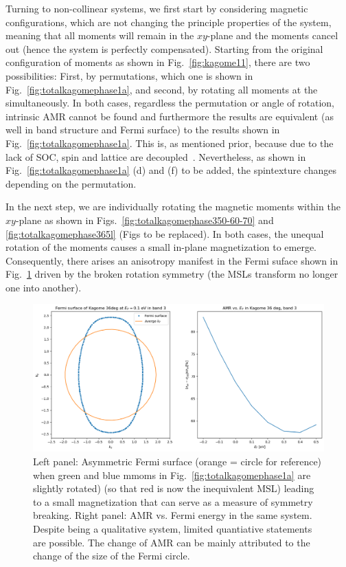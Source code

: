 \documentclass[prb,showpacs,amsmath,amssymb,superscriptaddress,twocolumn,floatfix]{revtex4-1}
\begin{document}
Turning to non-collinear systems, we
first start by considering magnetic configurations, which are not changing the principle properties of the system, meaning that all moments will remain in the $xy$-plane and the moments cancel out (hence the system is perfectly compensated). Starting from the original configuration of moments as shown in Fig.~\ref{fig:kagome11}, there are two possibilities: First, by permutations, which one is shown in Fig.~\ref{fig:totalkagomephase1a}, and second, by rotating all moments at the simultaneously. In both cases, regardless the permutation or angle of rotation, intrinsic AMR cannot be found and furthermore the results are equivalent (as well in band structure and Fermi surface) to the results shown in Fig.~\ref{fig:totalkagomephase1a}. This is, as mentioned prior, because due to the lack of SOC, spin and lattice are decoupled~\cite{Gonzalez-Hernandez:2024}. Nevertheless, as shown in Fig.~\ref{fig:totalkagomephase1a} (d) and (f) {\color{red} to be added}, the spintexture changes depending on the permutation. 

In the next step, we are individually rotating the magnetic moments within the $xy$-plane as shown in Figs.~\ref{fig:totalkagomephase350-60-70} and \ref{fig:totalkagomephase365l} {\color{red} (Figs to be replaced)}. In both cases, the unequal rotation of the moments causes a small in-plane magnetization to emerge.
Consequently, there arises an anisotropy manifest in the Fermi suface
shown in Fig.~\ref{fig:asymmFS} driven by the broken rotation symmetry (the MSLs
transform no longer one into another).

\begin{figure}
	\centering
	\includegraphics[width=0.9\linewidth]{img/fig4}
	\caption{Left panel: Asymmetric Fermi surface (orange = circle for reference) when green and blue mmoms in Fig.~\ref{fig:totalkagomephase1a} are slightly rotated) (so that red is now the inequivalent MSL) leading to a small magnetization that can serve as a measure of symmetry breaking. Right panel: AMR vs. Fermi energy in the same system. Despite being a qualitative system, limited quantiative statements are possible. The change of AMR can be mainly attributed to the change of the size of the Fermi circle.
      }
   \label{fig:asymmFS}
\end{figure}
\end{document}
